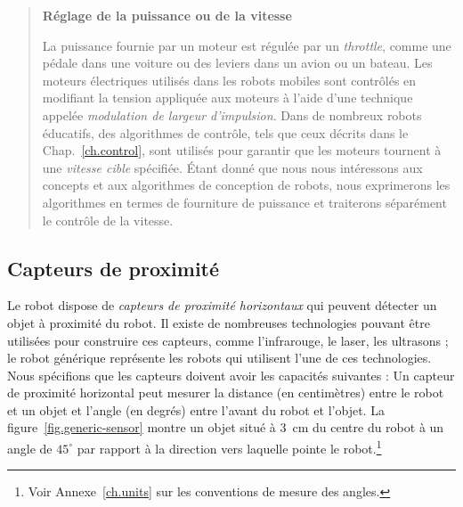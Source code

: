 \begin{quote}
\begin{center}
\textbf{Réglage de la puissance ou de la vitesse}
\end{center}
La puissance fournie par un moteur est régulée par un \emph{throttle}, comme une pédale dans une voiture ou des leviers dans un avion ou un bateau. Les moteurs électriques utilisés dans les robots mobiles sont contrôlés en modifiant la tension appliquée aux moteurs à l'aide d'une technique appelée \emph{modulation de largeur d'impulsion}. Dans de nombreux robots éducatifs, des algorithmes de contrôle, tels que ceux décrits dans le Chap.~\ref{ch.control}, sont utilisés pour garantir que les moteurs tournent à une \emph{vitesse cible} spécifiée. Étant donné que nous nous intéressons aux concepts et aux algorithmes de conception de robots, nous exprimerons les algorithmes en termes de fourniture de puissance et traiterons séparément le contrôle de la vitesse.
\end{quote}

\subsection{Capteurs de proximité}

Le robot dispose de \emph{capteurs de proximité horizontaux} qui peuvent détecter un objet à proximité du robot. Il existe de nombreuses technologies pouvant être utilisées pour construire ces capteurs, comme l'infrarouge, le laser, les ultrasons ; le robot générique représente les robots qui utilisent l'une de ces technologies. Nous spécifions que les capteurs doivent avoir les capacités suivantes : Un capteur de proximité horizontal peut mesurer la distance (en centimètres) entre le robot et un objet et l'angle (en degrés) entre l'avant du robot et l'objet. La figure~\ref{fig.generic-sensor} montre un objet situé à $3\,$ cm du centre du robot à un angle de $45^{\circ}$ par rapport à la direction vers laquelle pointe le robot.\footnote{Voir Annexe~\ref{ch.units} sur les conventions de mesure des angles.}

